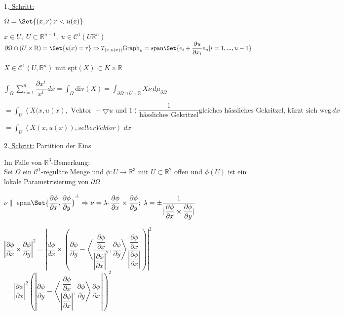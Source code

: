 \documentclass[11pt]{memoir}
\newcommand{\pax}{\partial x}
\newcommand{\pay}{\partial y}
\newcommand{\pap}{\partial\phi}
\begin{document}
\par\bigskip

\underline{$1.$ Schritt:} 
\par
$\Omega = \Set{(x, r) | r < u(x)}$ 
\par
$x \in U,\; U \subset \mathbb R^{n-1},\; u \in \mathscr C^1(U \mathbb R^n)$ \\
$\partial\Omega \cap (U \times \mathbb R) = \Set{u(x) = r} \Rightarrow T_{(x, u(x))}  \text{Graph}_u = \text{span}\Set{e_i + \dfrac{\partial u}{\partial  x_i}  e_n | i = 1, ..., n-1}$

$X \in \mathscr C^1(U, \mathbb R^n)$ mit spt$(X) \subset K \times \mathbb R$

$\int_\Omega \sum\limits_{i=1}^n \dfrac{\partial x^i}{x ^i} \, dx = \int_\Omega \text{div}(X) = \int_{\partial \Omega \cap U \times \mathbb R} X \nu \, d\mu_{\partial \Omega}$
\par
$ = \int_U \left\langle X(x, u(x), \text{ Vektor }-\bigtriangledown u \text{ und }1 \right\rangle \dfrac{1}{\text{hässliches Gekritzel}} \text{gleiches hässliches Gekritzel, kürzt sich weg} \, dx $
\par
$= \int_U \left\langle X(x, u(x)), selber Vektor \right\rangle \; dx$

\par\bigskip

\underline{$2.$ Schritt:} Partition der Eins
\par
Im Falle von $\mathbb R^3$-Bemerkung: \\
Sei $\Omega$ ein $\mathscr C^1$-reguläre Menge und $\phi: U \rightarrow \mathbb R^3$ mit $U \subset \mathbb R^2$ offen und $\phi(U)$ ist ein lokale Parametrisierung von $\partial \Omega$

$\nu \| $ span$\Set{\dfrac{\partial\phi}{\partial x}, \dfrac{\partial \phi}{\partial y}}^\bot \Rightarrow \nu = \lambda \cdotp \dfrac{\partial \phi}{\partial x} \times \dfrac{\partial \phi}{\partial y}; \; \lambda = \pm \dfrac{1}{| \dfrac{\partial \phi}{\partial x} \times \dfrac{\partial \phi}{\partial y}|}$

$\left\lvert\dfrac{\partial \phi}{\partial x} \times \dfrac{\partial \phi}{\partial y}\right\rvert^2 = \left\lvert\dfrac{d \phi}{d x} \times \left(  \dfrac{\pap}{\pay} - \left\langle\dfrac{ \dfrac{\pap}{\pax}}{\left\lvert\dfrac{\pap}{\pax}\right\rvert^2}, \dfrac{\pap}{\pay}\right\rangle \dfrac{ \dfrac{\pap}{\pax}}{\left\lvert\dfrac{\pap}{\pax}\right\rvert}\right) \right\rvert^2$ \\

$= |\dfrac{\pap}{\pax}|^2 \left(|\dfrac{\pap}{\pay} - \left\langle\dfrac{ \dfrac{\pap}{\pax}}{|\dfrac{\pap}{\pax}|}, \dfrac{\pap}{\pay}\right\rangle \dfrac{\pap}{\pax}|\right)^2$ \\
\end{document}
